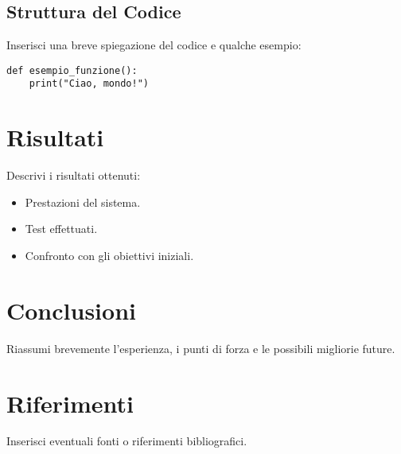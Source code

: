 \documentclass[a4paper,12pt]{article}
\begin{document}
\subsection{Struttura del Codice}
Inserisci una breve spiegazione del codice e qualche esempio:

\begin{lstlisting}[caption=Esempio di codice]
def esempio_funzione():
    print("Ciao, mondo!")
\end{lstlisting}

\section{Risultati}
Descrivi i risultati ottenuti:
\begin{itemize}
    \item Prestazioni del sistema.
    \item Test effettuati.
    \item Confronto con gli obiettivi iniziali.
\end{itemize}

\section{Conclusioni}
Riassumi brevemente l'esperienza, i punti di forza e le possibili migliorie future.

\section*{Riferimenti}
Inserisci eventuali fonti o riferimenti bibliografici.
\end{document}
